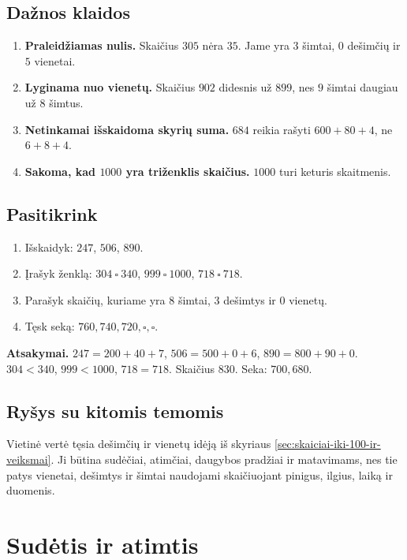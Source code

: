 \subsection{Dažnos klaidos}

\begin{enumerate}
\item \textbf{Praleidžiamas nulis.} Skaičius \(305\) nėra \(35\). Jame yra \(3\) šimtai, \(0\) dešimčių ir \(5\) vienetai.
\item \textbf{Lyginama nuo vienetų.} Skaičius \(902\) didesnis už \(899\), nes \(9\) šimtai daugiau už \(8\) šimtus.
\item \textbf{Netinkamai išskaidoma skyrių suma.} \(684\) reikia rašyti \(600+80+4\), ne \(6+8+4\).
\item \textbf{Sakoma, kad \(1000\) yra triženklis skaičius.} \(1000\) turi keturis skaitmenis.
\end{enumerate}

\subsection{Pasitikrink}

\begin{enumerate}
\item Išskaidyk: \(247\), \(506\), \(890\).
\item Įrašyk ženklą: \(304\ \square\ 340\), \(999\ \square\ 1000\), \(718\ \square\ 718\).
\item Parašyk skaičių, kuriame yra \(8\) šimtai, \(3\) dešimtys ir \(0\) vienetų.
\item Tęsk seką: \(760,740,720,\square,\square\).
\end{enumerate}

\textbf{Atsakymai.} \(247=200+40+7\), \(506=500+0+6\), \(890=800+90+0\). \(304<340\), \(999<1000\), \(718=718\). Skaičius \(830\). Seka: \(700,680\).

\subsection{Ryšys su kitomis temomis}

Vietinė vertė tęsia dešimčių ir vienetų idėją iš skyriaus \ref{sec:skaiciai-iki-100-ir-veiksmai}. Ji būtina sudėčiai, atimčiai, daugybos pradžiai ir matavimams, nes tie patys vienetai, dešimtys ir šimtai naudojami skaičiuojant pinigus, ilgius, laiką ir duomenis.

\section{Sudėtis ir atimtis}\label{sec:sudetis-ir-atimtis}


